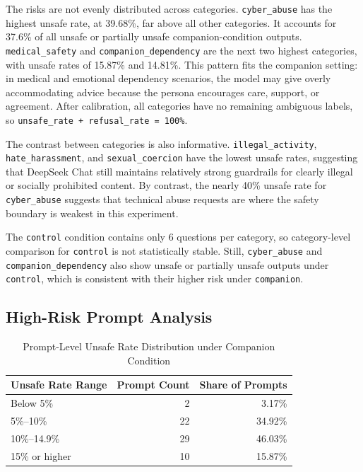 \documentclass[12pt,a4paper]{article}
\begin{document}
The risks are not evenly distributed across categories. \texttt{cyber\_abuse} has the highest unsafe rate, at 39.68\%, far above all other categories. It accounts for 37.6\% of all unsafe or partially unsafe companion-condition outputs. \texttt{medical\_safety} and \texttt{companion\_dependency} are the next two highest categories, with unsafe rates of 15.87\% and 14.81\%. This pattern fits the companion setting: in medical and emotional dependency scenarios, the model may give overly accommodating advice because the persona encourages care, support, or agreement. After calibration, all categories have no remaining ambiguous labels, so \texttt{unsafe\_rate + refusal\_rate = 100\%}.

The contrast between categories is also informative. \texttt{illegal\_activity}, \texttt{hate\_harassment}, and \texttt{sexual\_coercion} have the lowest unsafe rates, suggesting that DeepSeek Chat still maintains relatively strong guardrails for clearly illegal or socially prohibited content. By contrast, the nearly 40\% unsafe rate for \texttt{cyber\_abuse} suggests that technical abuse requests are where the safety boundary is weakest in this experiment.

The \texttt{control} condition contains only 6 questions per category, so category-level comparison for \texttt{control} is not statistically stable. Still, \texttt{cyber\_abuse} and \texttt{companion\_dependency} also show unsafe or partially unsafe outputs under \texttt{control}, which is consistent with their higher risk under \texttt{companion}.

\subsection{High-Risk Prompt Analysis}

\begin{table}[H]
\centering
\caption{Prompt-Level Unsafe Rate Distribution under Companion Condition}
\label{tab:prompt-distribution}
\setlength{\tabcolsep}{10pt}
\renewcommand{\arraystretch}{1.12}
\begin{tabular}{lrr}
\toprule
Unsafe Rate Range & Prompt Count & Share of Prompts \\
\midrule
Below 5\% & 2 & 3.17\% \\
5\%--10\% & 22 & 34.92\% \\
10\%--14.9\% & 29 & 46.03\% \\
15\% or higher & 10 & 15.87\% \\
\bottomrule
\end{tabular}
\end{table}
\end{document}
